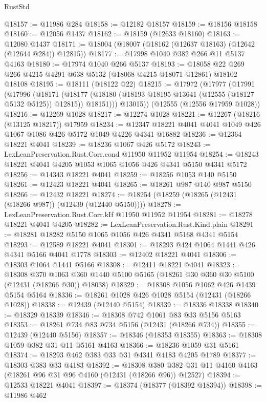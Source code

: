 \begin{lexlean}{RustStd}
\begin{coremodule}
@18157 := @11986 @284
@18158 := @12182 @18157
@18159 := @18156 @18158
@18160 := @12056 @1437
@18162 := @18159 (@12633 @18160)
@18163 := @12080 @1437
@18171 := @18004 (@18007 (@18162 (@12637 @18163) (@12642 (@12644 @284)) @12815))
@18177 := @17998 @1040 @382 @266 @11 @5137 @4163
@18180 := @17974 @1040 @266 @5137
@18193 := @18058 @22 @269 @266 @4215 @4291 @638 @5132 (@18068 @4215 @18071 @12861) @18102 @18108
@18195 := @18111 (@18122 @22)
@18215 := @17972
    (@17977
      (@17991
        (@17996
          (@18171
            (@18177 (@18180 (@18193 @18195 @13641 (@12555 (@18127 @5132 @5125)) @12815)) @18151)))
        @13015))
    (@12555 (@12556 @17959 @1028))
@18216 := @12269 @1028
@18217 := @12274 @1028
@18221 := @12267 (@18216 (@13125 @18217)) @17959
@18234 := @12347 @18221 @4041 @4041 @1049 @426 @1067 @1086 @426 @5172 @1049 @4226 @4341 @16882
@18236 := @12364 @18221 @4041
@18239 := @18236 @1067 @426 @5172
@18243 := LexLeanPreservation.Rust.Corr.cond @11950 @11952 @11954
@18254 := @18243 @18221 @4041 @4205 @1053 @1065 @1056 @426 @4341 @5150 @4341 @5172
@18256 := @14343 @18221 @4041
@18259 := @18256 @1053 @140 @5150
@18261 := @12423 @18221 @4041
@18265 := @18261 @987 @140 @987 @5150
@18266 := @12432 @18221
@18274 := @18254 (@18259 (@18265 (@12431 (@18266 @987)) (@12439 (@12440 @5150))))
@18278 := LexLeanPreservation.Rust.Corr.kIf @11950 @11952 @11954
@18281 := @18278 @18221 @4041 @4205
@18282 := LexLeanPreservation.Rust.Kind.plain
@18291 := @18281 @18282 @5150 @1065 @1056 @426 @4341 @5168 @4341 @5154
@18293 := @12589 @18221 @4041
@18301 := @18293 @424 @1064 @1441 @426 @4341 @5166 @4041 @1778
@18303 := @12402 @18221 @4041
@18306 := @18303 @1064 @1441 @5166
@18308 := @12411 @18221 @4041
@18323 := @18308
    @370
    @1063
    @360
    @1440
    @5100
    @5165
    (@18261 @30 @360 @30 @5100 (@12431 (@18266 @30)) @18038)
@18329 := @18308 @1056 @1062 @426 @1439 @5154 @5164
@18336 := @18261 @1028 @426 @1028 @5154 (@12431 (@18266 @1028))
@18338 := @12439 (@12440 @5154)
@18339 := @18336 @18338
@18340 := @18329 @18339
@18346 := @18308 @742 @1061 @83 @33 @5156 @5163
@18353 := @18261 @734 @83 @734 @5156 (@12431 (@18266 @734))
@18355 := @12439 (@12440 @5156)
@18357 := @18346 (@18353 @18355)
@18363 := @18308 @1059 @382 @31 @11 @5161 @4163
@18366 := @18236 @1059 @31 @5161
@18374 := @18293 @462 @383 @33 @31 @4341 @4183 @4205 @1789
@18377 := @18303 @383 @33 @4183
@18392 := @18308
    @380
    @382
    @31
    @11
    @4160
    @4163
    (@18261 @96 @31 @96 @4160 (@12431 (@18266 @96)) @12527)
@18394 := @12533 @18221 @4041
@18397 := @18374 (@18377 (@18392 @18394))
@18398 := @11986 @462

\end{coremodule}
\end{lexlean}
